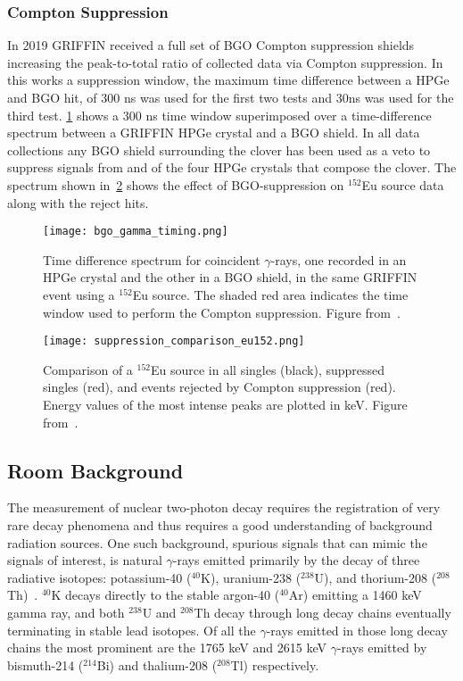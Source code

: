 \documentclass[cnatzke_thesis_proposal.tex]{subfiles}
\begin{document}
\subsubsection{Compton Suppression}
In 2019 GRIFFIN received a full set of BGO Compton suppression shields increasing the peak-to-total ratio of collected data via Compton suppression.
In this works a suppression window, the maximum time difference between a HPGe and BGO hit, of 300 ns was used for the first two tests and 30ns was used for the third test. \ref{fig:bgo_gamma_timing} shows a 300 ns time window superimposed over a time-difference spectrum between a GRIFFIN HPGe crystal and a BGO shield. 
In all data collections any BGO shield surrounding the clover has been used as a veto to suppress signals from and of the four HPGe crystals that compose the clover. 
The spectrum shown in~\ref{fig:suppression_comparison_eu152} shows the effect of BGO-suppression on $^{152}$Eu source data along with the reject hits.

\begin{figure}[htbp]
  \centering
  \texttt{[image: bgo\_gamma\_timing.png]}
  \caption{Time difference spectrum for coincident $\gamma$-rays, one recorded in an HPGe crystal and the other in a BGO shield, in the same GRIFFIN event using a $^{152}$Eu source. The shaded red area indicates the time window used to perform the Compton suppression. Figure from~\cite{porzio_configuration_2021}.}
  \label{fig:bgo_gamma_timing}
\end{figure}

\begin{figure}[htbp]
  \centering
  \texttt{[image: suppression\_comparison\_eu152.png]}
  \caption{Comparison of a $^{152}$Eu source in all singles (black), suppressed singles (red), and events rejected by Compton suppression (red). Energy values of the most intense peaks are plotted in keV. Figure from~\cite{porzio_configuration_2021}.}
  \label{fig:suppression_comparison_eu152}
\end{figure}
\subsection{Room Background}
\label{sec:room_background}
The measurement of nuclear two-photon decay requires the registration of very rare decay phenomena and thus requires a good understanding of background radiation sources. 
One such background, spurious signals that can mimic the signals of interest, is natural $\gamma$-rays emitted primarily by the decay of three radiative isotopes: potassium-40 ($^{40}$K), uranium-238 ($^{238}$U), and thorium-208 ($^{208}$Th)~\cite[]{aksoy_elemental_1994}.
$^{40}$K decays directly to the stable argon-40 ($^{40}$Ar) emitting a 1460 keV gamma ray, and both $^{238}$U and $^{208}$Th decay through long decay chains eventually terminating in stable lead isotopes. 
Of all the $\gamma$-rays emitted in those long decay chains the most prominent are the 1765 keV and 2615 keV $\gamma$-rays emitted by bismuth-214 ($^{214}$Bi) and thalium-208 ($^{208}$Tl) respectively.
\end{document}

